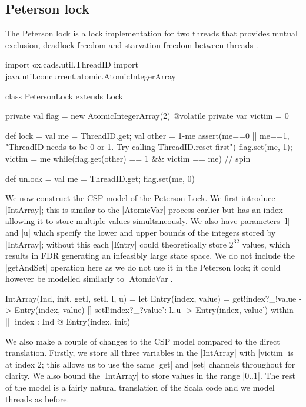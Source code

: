 \subsection{Peterson lock}\label{section:peterson-lock}

The Peterson lock is a lock implementation for two threads that provides mutual exclusion, deadlock-freedom and starvation-freedom between threads \cite{Peterson}.

\begin{scala}[caption={The Peterson lock code, adapted from \cite{CADS}}]
import ox.cads.util.ThreadID
import java.util.concurrent.atomic.AtomicIntegerArray

class PetersonLock extends Lock{
  private val flag = new AtomicIntegerArray(2)
  @volatile private var victim = 0

  def lock = {
    val me = ThreadID.get; val other = 1-me 
    assert(me==0 || me==1, 
      "ThreadID needs to be 0 or 1.  Try calling ThreadID.reset first")
    flag.set(me, 1); victim = me
    while(flag.get(other) == 1 && victim == me){ } // spin
  }

  def unlock = { val me = ThreadID.get; flag.set(me, 0) }
}
\end{scala}

We now construct the CSP model of the Peterson Lock. We first introduce |IntArray|; this is similar to the |AtomicVar| process earlier but has an index allowing it to store multiple values simultaneously. We also have parameters |l| and |u| which specify the lower and upper bounds of the integers stored by |IntArray|; without this each |Entry| could theoretically store $2^{32}$ values, which results in FDR generating an infeasibly large state space. We do not include the |getAndSet| operation here as we do not use it in the Peterson lock; it could however be modelled similarly to |AtomicVar|.

\begin{cspm}
IntArray(Ind, init, getI, setI, l, u) = 
  let Entry(index, value) = 
            get!index?_!value -> Entry(index, value)
         [] setI!index?_?value': {l..u} -> Entry(index, value')
  within ||| index : Ind @ Entry(index, init)
\end{cspm}

We also make a couple of changes to the CSP model compared to the direct translation. Firstly, we store all three variables in the |IntArray| with |victim| is at index 2; this allows us to use the same |get| and |set| channels throughout for clarity. We also bound the |IntArray| to store values in the range |{0..1}|. The rest of the model is a fairly natural translation of the Scala code and we model threads as before.

